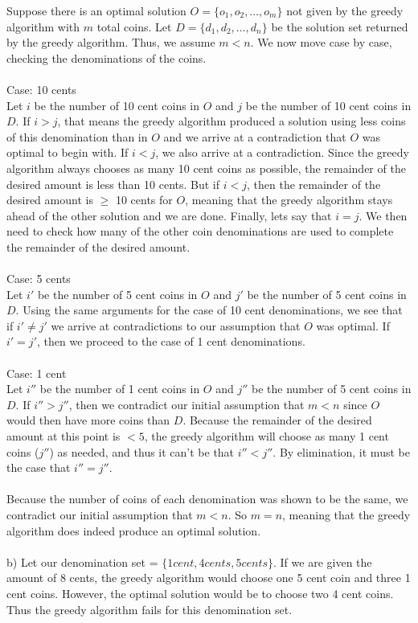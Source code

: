 \documentclass[12pt, oneside]{article}
\begin{document}
Suppose there is an optimal solution $O = \{o_1,o_2,\dots,o_m\}$ not given by the greedy algorithm with $m$ total coins. Let $D = \{d_1,d_2,\dots,d_n\}$ be the solution set returned by the greedy algorithm. Thus, we assume $m < n$. We now move case by case, checking the denominations of the coins.\\\\
Case: 10 cents\\
Let $i$ be the number of 10 cent coins in $O$ and $j$ be the number of 10 cent coins in $D$. If $i > j$, that means the greedy algorithm produced a solution using less coins of this denomination than in $O$ and we arrive at a contradiction that $O$ was optimal to begin with. If $i < j$, we also arrive at a contradiction. Since the greedy algorithm always chooses as many 10 cent coins as possible, the remainder of the desired amount is less than 10 cents. But if $i < j$, then the remainder of the desired amount is $\geq$ 10 cents for $O$, meaning that the greedy algorithm stays ahead of the other solution and we are done. Finally, lets say that $i = j$. We then need to check how many of the other coin denominations are used to complete the remainder of the desired amount.\\\\
Case: 5 cents\\
Let $i'$ be the number of 5 cent coins in $O$ and $j'$ be the number of 5 cent coins in $D$. Using the same arguments for the case of 10 cent denominations, we see that if $i' \neq j'$ we arrive at contradictions to our assumption that $O$ was optimal. If $i' = j'$, then we proceed to the case of 1 cent denominations.\\\\
Case: 1 cent\\
Let $i''$ be the number of 1 cent coins in $O$ and $j''$ be the number of 5 cent coins in $D$. If $i'' > j''$, then we contradict our initial assumption that $m < n$ since $O$ would then have more coins than $D$. Because the remainder of the desired amount at this point is $< 5$, the greedy algorithm will choose as many 1 cent coins ($j''$) as needed, and thus it can't be that $i'' < j''$. By elimination, it must be the case that $i'' = j''$.\\\\
Because the number of coins of each denomination was shown to be the same, we contradict our initial assumption that $m < n$. So $m = n$, meaning that the greedy algorithm does indeed produce an optimal solution.\\\\
b)
Let our denomination set = $\{1 cent, 4 cents, 5 cents\}$. If we are given the amount of 8 cents, the greedy algorithm would choose one 5 cent coin and three 1 cent coins. However, the optimal solution would be to choose two 4 cent coins. Thus the greedy algorithm fails for this denomination set.\\
\end{document}
